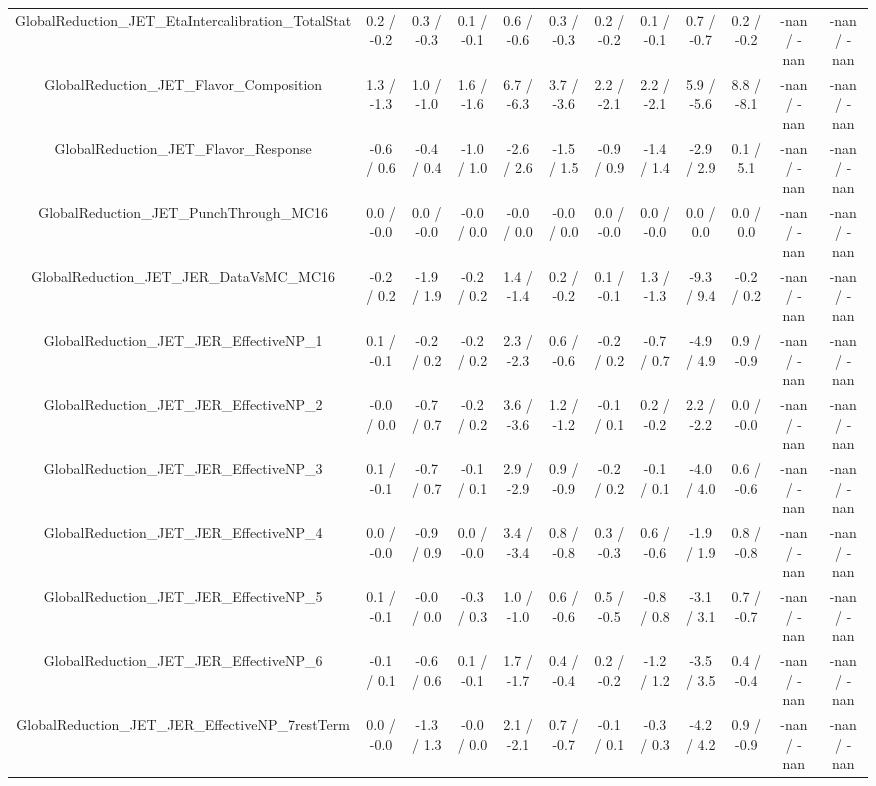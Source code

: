\begin{table}[htbp]
\begin{center}
\begin{tabular}{|c|c|c|c|c|c|c|c|c|c|c|c|}
  GlobalReduction_JET_EtaIntercalibration_TotalStat & 0.2 / -0.2 & 0.3 / -0.3 & 0.1 / -0.1 & 0.6 / -0.6 & 0.3 / -0.3 & 0.2 / -0.2 & 0.1 / -0.1 & 0.7 / -0.7 & 0.2 / -0.2 & -nan / -nan & -nan / -nan \\ 
  GlobalReduction_JET_Flavor_Composition & 1.3 / -1.3 & 1.0 / -1.0 & 1.6 / -1.6 & 6.7 / -6.3 & 3.7 / -3.6 & 2.2 / -2.1 & 2.2 / -2.1 & 5.9 / -5.6 & 8.8 / -8.1 & -nan / -nan & -nan / -nan \\ 
  GlobalReduction_JET_Flavor_Response & -0.6 / 0.6 & -0.4 / 0.4 & -1.0 / 1.0 & -2.6 / 2.6 & -1.5 / 1.5 & -0.9 / 0.9 & -1.4 / 1.4 & -2.9 / 2.9 & 0.1 / 5.1 & -nan / -nan & -nan / -nan \\ 
  GlobalReduction_JET_PunchThrough_MC16 & 0.0 / -0.0 & 0.0 / -0.0 & -0.0 / 0.0 & -0.0 / 0.0 & -0.0 / 0.0 & 0.0 / -0.0 & 0.0 / -0.0 & 0.0 / 0.0 & 0.0 / 0.0 & -nan / -nan & -nan / -nan \\ 
  GlobalReduction_JET_JER_DataVsMC_MC16 & -0.2 / 0.2 & -1.9 / 1.9 & -0.2 / 0.2 & 1.4 / -1.4 & 0.2 / -0.2 & 0.1 / -0.1 & 1.3 / -1.3 & -9.3 / 9.4 & -0.2 / 0.2 & -nan / -nan & -nan / -nan \\ 
  GlobalReduction_JET_JER_EffectiveNP_1 & 0.1 / -0.1 & -0.2 / 0.2 & -0.2 / 0.2 & 2.3 / -2.3 & 0.6 / -0.6 & -0.2 / 0.2 & -0.7 / 0.7 & -4.9 / 4.9 & 0.9 / -0.9 & -nan / -nan & -nan / -nan \\ 
  GlobalReduction_JET_JER_EffectiveNP_2 & -0.0 / 0.0 & -0.7 / 0.7 & -0.2 / 0.2 & 3.6 / -3.6 & 1.2 / -1.2 & -0.1 / 0.1 & 0.2 / -0.2 & 2.2 / -2.2 & 0.0 / -0.0 & -nan / -nan & -nan / -nan \\ 
  GlobalReduction_JET_JER_EffectiveNP_3 & 0.1 / -0.1 & -0.7 / 0.7 & -0.1 / 0.1 & 2.9 / -2.9 & 0.9 / -0.9 & -0.2 / 0.2 & -0.1 / 0.1 & -4.0 / 4.0 & 0.6 / -0.6 & -nan / -nan & -nan / -nan \\ 
  GlobalReduction_JET_JER_EffectiveNP_4 & 0.0 / -0.0 & -0.9 / 0.9 & 0.0 / -0.0 & 3.4 / -3.4 & 0.8 / -0.8 & 0.3 / -0.3 & 0.6 / -0.6 & -1.9 / 1.9 & 0.8 / -0.8 & -nan / -nan & -nan / -nan \\ 
  GlobalReduction_JET_JER_EffectiveNP_5 & 0.1 / -0.1 & -0.0 / 0.0 & -0.3 / 0.3 & 1.0 / -1.0 & 0.6 / -0.6 & 0.5 / -0.5 & -0.8 / 0.8 & -3.1 / 3.1 & 0.7 / -0.7 & -nan / -nan & -nan / -nan \\ 
  GlobalReduction_JET_JER_EffectiveNP_6 & -0.1 / 0.1 & -0.6 / 0.6 & 0.1 / -0.1 & 1.7 / -1.7 & 0.4 / -0.4 & 0.2 / -0.2 & -1.2 / 1.2 & -3.5 / 3.5 & 0.4 / -0.4 & -nan / -nan & -nan / -nan \\ 
  GlobalReduction_JET_JER_EffectiveNP_7restTerm & 0.0 / -0.0 & -1.3 / 1.3 & -0.0 / 0.0 & 2.1 / -2.1 & 0.7 / -0.7 & -0.1 / 0.1 & -0.3 / 0.3 & -4.2 / 4.2 & 0.9 / -0.9 & -nan / -nan & -nan / -nan \\ 

\end{tabular}
\end{center}
\end{table}
